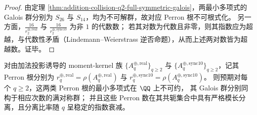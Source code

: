 \begin{proof}
由定理 \ref{thm:addition-collision-q2-full-symmetric-galois}，两最小多项式的 Galois 群分别为 \(S_{26}\) 与 \(S_{14}\)，均为不可解群，故对应 Perron 根不可根式化。
另一方面，\(\frac{16}{r^{\oplus,\mathrm{real}}_2}\) 与 \(\frac{16}{r^{\oplus,\mathrm{sync10}}_2}\) 为非 \(1\) 的代数数；
若其对数为代数且非零，则其指数应为超越，与代数性矛盾（Lindemann--Weierstrass 逆否命题），从而上述两对数皆为超越数。证毕。
\end{proof}

\begin{conjecture}\label{conj:addition-collision-higher-q-full-symmetric}
对由加法投影诱导的 moment-kernel 族 \(\{A^{\oplus,\mathrm{real}}_q\}_{q\ge 2}\) 与 \(\{A^{\oplus,\mathrm{sync10}}_q\}_{q\ge 2}\)，记其 Perron 根分别为
\(r^{\oplus,\mathrm{real}}_q=\rho(A^{\oplus,\mathrm{real}}_q)\) 与 \(r^{\oplus,\mathrm{sync10}}_q=\rho(A^{\oplus,\mathrm{sync10}}_q)\)。
则预期对每个 \(q\ge 2\)，这两类 Perron 根的最小多项式在 \(\QQ\) 上不可约，
其 Galois 群分别同构于相应次数的满对称群；
并且这些 Perron 数在其共轭集合中具有严格模长分离，且分离比率随 \(q\) 呈稳定的指数衰减。
\end{conjecture}
